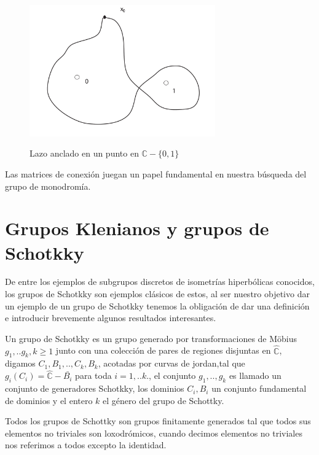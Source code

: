\begin{figure}[h]
  \centering
  \includegraphics[width=8cm]{continuacion-analitica.pdf}\\
  \caption{Lazo anclado en un punto en $\mathbb{C}- \lbrace 0,1 \rbrace$ }\label{continuacion-analitica}
\end{figure}


Las matrices de conexi\'on juegan un papel fundamental en nuestra b\'usqueda del grupo de monodrom\'ia.

\section{Grupos Klenianos y grupos de Schotkky}

De entre los ejemplos de subgrupos discretos de isometr\'ias hiperb\'olicas conocidos, los grupos de Schotkky son ejemplos cl\'asicos de estos, al ser nuestro objetivo dar un ejemplo de un grupo de Schotkky tenemos la obligaci\'on de dar una definici\'on e introducir brevemente algunos resultados interesantes.

\begin{defn}
Un grupo de Schotkky  es un grupo generado por transformaciones de Möbius $g_{1},..g_{k},k \geq 1$ junto con una colecci\'on de pares de regiones disjuntas en $\widehat{\mathbb{C}}$, digamos $C_{1},B_{1},..,C_{k},B_{k}$, acotadas por curvas de jordan,tal que $g_{i} (C_{i}) = \widehat{\mathbb{C}} - \bar{B_{i}}$ para toda $i=1,..k.$, el conjunto $g_{1},..,g_{k}$ es llamado un conjunto de generadores Schotkky, los dominios $C_{i},B_{i}$ un conjunto fundamental de dominios y el entero $k$ el g\'enero del grupo de Schottky.
\end{defn}

Todos los grupos de Schottky son grupos finitamente generados tal que todos sus elementos no triviales son loxodr\'omicos, cuando decimos elementos no triviales nos referimos a todos excepto la identidad.

